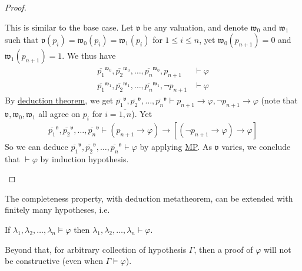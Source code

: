 \documentclass{treatise}
\begin{document}
\begin{proof}
\begin{enumerate}
    This is similar to the base case. Let $\mathfrak{v}$ be any valuation, and denote $\mathfrak{w}_0$ and $\mathfrak{w}_1$ such that $\mathfrak{v}(p_i) = \mathfrak{w}_0 (p_i) = \mathfrak{w}_1 (p_i)$ for $1 \leq i \leq n$, yet $\mathfrak{w}_0 (p_{n + 1}) = 0$ and $\mathfrak{w}_1 (p_{n + 1}) = 1$.
    We thus have
    \begin{align*}
        \overline{p_1}^\mathfrak{w_0}, \overline{p_2}^\mathfrak{w_0}, \hdots, \overline{p_n}^\mathfrak{w_0}, p_{n + 1} & \vdash \varphi
        \\
        \overline{p_1}^\mathfrak{w_1}, \overline{p_2}^\mathfrak{w_1}, \hdots, \overline{p_n}^\mathfrak{w_1}, \neg p_{n + 1} & \vdash \varphi
    \end{align*}
    By \hyperref[logic-deduct-metathm]{deduction theorem}, we get $\overline{p_1}^\mathfrak{v}, \overline{p_2}^\mathfrak{v}, \hdots, \overline{p_n}^\mathfrak{v} \vdash p_{n + 1} \to \varphi, \neg p_{n + 1} \to \varphi$ (note that $\mathfrak{v}, \mathfrak{w_0}, \mathfrak{w_1}$ all agree on $p_i$ for $i = \overline{1, n}$). Yet
    \begin{align*}
        \overline{p_1}^\mathfrak{v}, \overline{p_2}^\mathfrak{v}, \hdots, \overline{p_n}^\mathfrak{v} \vdash (p_{n + 1} \to \varphi) \to [(\neg p_{n + 1} \to \varphi) \to \varphi]
    \end{align*}
    So we can deduce $\overline{p_1}^\mathfrak{v}, \overline{p_2}^\mathfrak{v}, \hdots, \overline{p_n}^\mathfrak{v} \vdash \varphi$ by applying \hyperref[HPL-R-MP]{MP}. As $\mathfrak{v}$ varies, we conclude that $\vdash \varphi$ by induction hypothesis.
\end{enumerate}
\end{proof}
\begin{remark}
The completeness property, with deduction metatheorem, can be extended with finitely many hypotheses, i.e.
\begin{center}
    If $\lambda_1, \lambda_2, \hdots, \lambda_n \vDash \varphi$ then $\lambda_1, \lambda_2, \hdots, \lambda_n \vdash \varphi$.
\end{center}
Beyond that, for arbitrary collection of hypothesis $\Gamma$, then a proof of $\varphi$ will not be constructive (even when $\Gamma \vDash \varphi$).
\end{remark}
\end{document}
